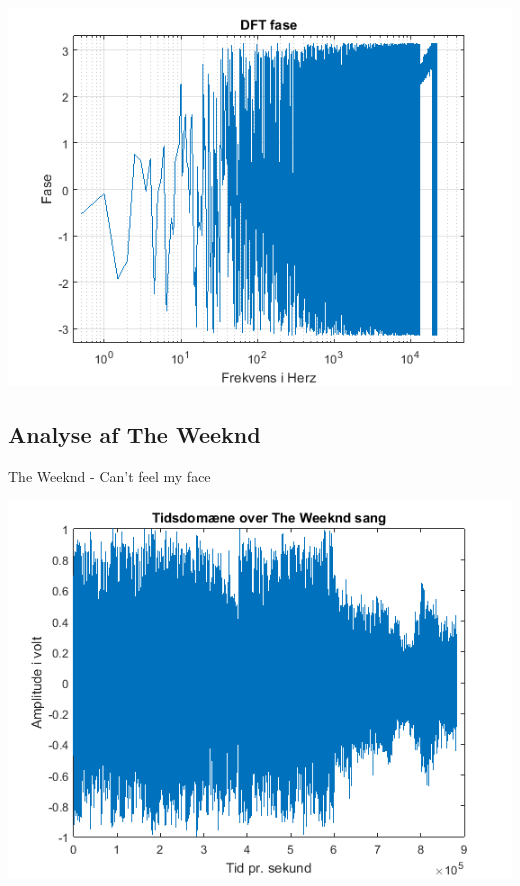 \documentclass[12pt, letterpaper]{article}
\begin{document}
\begin{center}
\includegraphics[width=\textwidth]{billeder/mozartfase}
\end{center}

\subsection{Analyse af The Weeknd}
The Weeknd - Can't feel my face

\begin{center}
\includegraphics[width=\textwidth]{billeder/weekndtid}
\end{center}
\end{document}
